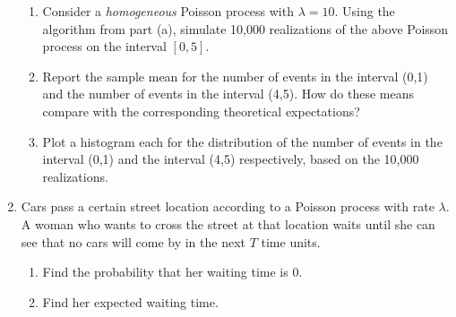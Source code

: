 \documentclass{article}
\begin{document}
\begin{enumerate}
\begin{enumerate}
  \item Consider a {\it homogeneous} Poisson process with $\lambda=10$. Using
  the algorithm from part (a), simulate 10,000 realizations of the above Poisson
  process on the interval $[0,5]$.

  \item Report the sample mean for the number of events in the interval (0,1)
  and the number of events in the interval (4,5). How do these means compare
  with the corresponding theoretical expectations?

  \item Plot a histogram each for the distribution of the number of events in
  the interval (0,1) and the interval (4,5) respectively, based on the 10,000
  realizations.

  \end{enumerate}

\item Cars pass a certain street location according to a Poisson process with
rate $\lambda$. A woman who wants to cross the street at that location waits
until she can see that no cars will come by in the next $T$ time units.

  \begin{enumerate}

  \item Find the probability that her waiting time is 0.

  \item Find her expected waiting time.

  \end{enumerate}

\end{enumerate}
\end{document}
